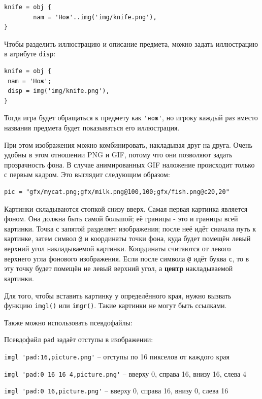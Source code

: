 \documentclass[12pt]{article}
\begin{document}
\begin{verbatim}
knife = obj {
        nam = 'Нож'..img('img/knife.png'),
}
\end{verbatim}

Чтобы разделить иллюстрацию и описание предмета, можно задать иллюстрацию в атрибуте \verb/disp/:

\begin{verbatim}
knife = obj {
 nam = 'Нож';
 disp = img('img/knife.png'),
}
\end{verbatim}

Тогда игра будет обращаться к предмету как \verb/'нож'/, но игроку каждый раз вместо названия предмета будет показываться его иллюстрация.

При этом изображения можно комбинировать, накладывая друг на друга. Очень удобны в этом отношении PNG и GIF, потому что они позволяют задать прозрачность фона.
В случае анимированных GIF наложение происходит только с первым кадром.
Это выглядит следующим образом:

\begin{verbatim}
pic = "gfx/mycat.png;gfx/milk.png@100,100;gfx/fish.png@c20,20"
\end{verbatim}

Картинки складываются стопкой снизу вверх. Самая первая картинка является фоном. Она должна быть самой большой; её границы - это и границы всей картинки.
Точка с запятой разделяет изображения; после неё идёт сначала путь к картинке, затем символ \verb/@/ и координаты точки фона, куда будет помещён левый верхний угол накладываемой картинки.
Координаты считаются от левого верхнего угла фонового изображения. Если после символа \verb/@/ идёт буква \verb/c/, то в эту точку будет помещён не левый верхний угол, а \textbf{центр} накладываемой картинки.

Для того, чтобы вставить картинку у определённого края, нужно вызвать функцию \verb/imgl()/ или \verb/imgr()/. Такие картинки не могут быть ссылками.

Также можно использовать псевдофайлы:

Псевдофайл \verb/pad/ задаёт отступы в изображении:

\verb/imgl 'pad:16,picture.png'/ -- отступы по 16 пикселов от каждого края

\verb/imgl 'pad:0 16 16 4,picture.png'/ -- вверху 0, справа 16, внизу 16, слева 4

\verb/imgl 'pad:0 16,picture.png'/ -- вверху 0, справа 16, внизу 0, слева 16
\end{document}
